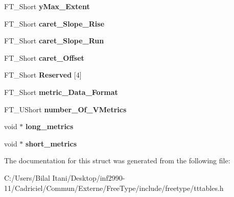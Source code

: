 \begin{DoxyCompactItemize}
\item 
F\+T\+\_\+\+Short {\bfseries y\+Max\+\_\+\+Extent}\hypertarget{struct_t_t___vert_header___af6927e95c1dfbe90c2e76b1eef521d53}{}\label{struct_t_t___vert_header___af6927e95c1dfbe90c2e76b1eef521d53}

\item 
F\+T\+\_\+\+Short {\bfseries caret\+\_\+\+Slope\+\_\+\+Rise}\hypertarget{struct_t_t___vert_header___a3218533a7d8ac5a8ebd70a970cbdbbcc}{}\label{struct_t_t___vert_header___a3218533a7d8ac5a8ebd70a970cbdbbcc}

\item 
F\+T\+\_\+\+Short {\bfseries caret\+\_\+\+Slope\+\_\+\+Run}\hypertarget{struct_t_t___vert_header___a98ff91b532d827440f7140d3071d473d}{}\label{struct_t_t___vert_header___a98ff91b532d827440f7140d3071d473d}

\item 
F\+T\+\_\+\+Short {\bfseries caret\+\_\+\+Offset}\hypertarget{struct_t_t___vert_header___a89ff9369f61dc5b770cde0eda954d402}{}\label{struct_t_t___vert_header___a89ff9369f61dc5b770cde0eda954d402}

\item 
F\+T\+\_\+\+Short {\bfseries Reserved} \mbox{[}4\mbox{]}\hypertarget{struct_t_t___vert_header___a54930b56bb8be0a8eb22753a9242fc5f}{}\label{struct_t_t___vert_header___a54930b56bb8be0a8eb22753a9242fc5f}

\item 
F\+T\+\_\+\+Short {\bfseries metric\+\_\+\+Data\+\_\+\+Format}\hypertarget{struct_t_t___vert_header___aa7c3983f62f7bf736eaaaae684b65dd7}{}\label{struct_t_t___vert_header___aa7c3983f62f7bf736eaaaae684b65dd7}

\item 
F\+T\+\_\+\+U\+Short {\bfseries number\+\_\+\+Of\+\_\+\+V\+Metrics}\hypertarget{struct_t_t___vert_header___a4ca6fe9cdd12fbc9a1129c4fbf6bddd1}{}\label{struct_t_t___vert_header___a4ca6fe9cdd12fbc9a1129c4fbf6bddd1}

\item 
void $\ast$ {\bfseries long\+\_\+metrics}\hypertarget{struct_t_t___vert_header___ac789245d0d6243bc965ad43702bdc671}{}\label{struct_t_t___vert_header___ac789245d0d6243bc965ad43702bdc671}

\item 
void $\ast$ {\bfseries short\+\_\+metrics}\hypertarget{struct_t_t___vert_header___ad5e875c19a02b0f6777db1c122bff2f3}{}\label{struct_t_t___vert_header___ad5e875c19a02b0f6777db1c122bff2f3}

\end{DoxyCompactItemize}


The documentation for this struct was generated from the following file\+:\begin{DoxyCompactItemize}
\item 
C\+:/\+Users/\+Bilal Itani/\+Desktop/inf2990-\/11/\+Cadriciel/\+Commun/\+Externe/\+Free\+Type/include/freetype/tttables.\+h\end{DoxyCompactItemize}
